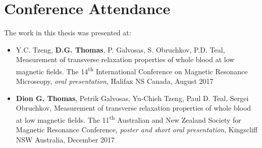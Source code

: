 \chapter*{Conference Attendance}
\label{ch:conference}
The work in this thesis was presented at:

\begin{itemize}
\item Y.C. Tzeng, \textbf{D.G. Thomas}, P. Galvosas, S. Obruchkov, P.D. Teal, Measurement of transverse relaxation properties of whole blood at low magnetic fields. The 14\textsuperscript{th} International Conference on Magnetic Resonance Microscopy, \textit{oral presentation}, Halifax NS Canada, August 2017
\item \textbf{Dion G. Thomas}, Petrik Galvosas, Yu-Chieh Tzeng, Paul D. Teal, Sergei Obruchkov, Measurement of transverse relaxation properties of whole blood at low magnetic fields. The 11\textsuperscript{th} Australian and New Zealand Society for Magnetic Resonance Conference, \textit{poster and short oral presentation}, Kingscliff NSW Australia, December 2017

\end{itemize}
